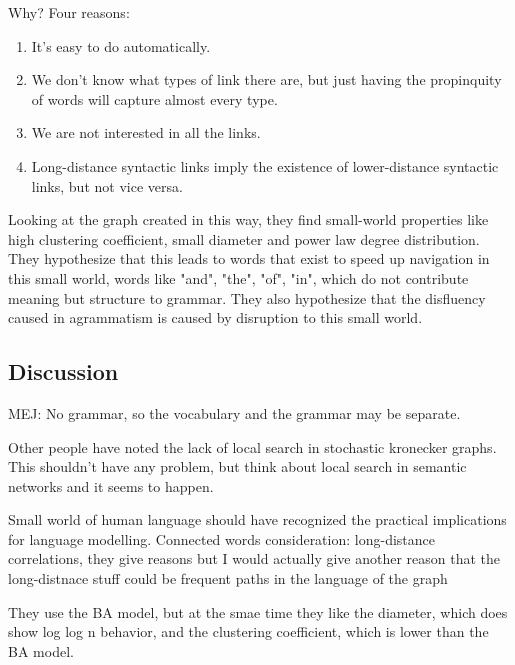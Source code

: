 \documentclass[12pt]{article}
\begin{document}
Why? Four reasons:

\begin{enumerate}
  \item It's easy to do automatically.
  \item We don't know what types of link there are, but just having the propinquity of words will capture almost every type.
  \item We are not interested in all the links.
  \item Long-distance syntactic links imply the existence of lower-distance syntactic links, but not vice versa.
\end{enumerate}

Looking at the graph created in this way, they find small-world properties like high clustering coefficient, small diameter and power law degree distribution. They hypothesize that this leads to words that exist to speed up navigation in this small world, words like "and", "the", "of", "in", which do not contribute meaning but structure to grammar. They also hypothesize that the disfluency caused in agrammatism is caused by disruption to this small world.

\subsection{Discussion} %
MEJ: No grammar, so the vocabulary and the grammar may be separate.

Other people have noted the lack of local search in stochastic kronecker graphs. This shouldn't have any problem, but think about local search in semantic networks and it seems to happen.

Small world of human language should have recognized the practical implications for language modelling. Connected words consideration: long-distance correlations, they give reasons but I would actually give another reason that the long-distnace stuff could be frequent paths in the language of the graph

They use the BA model, but at the smae time they like the diameter, which does show log log n behavior, and the clustering coefficient, which is lower than the BA model.

\end{document}
